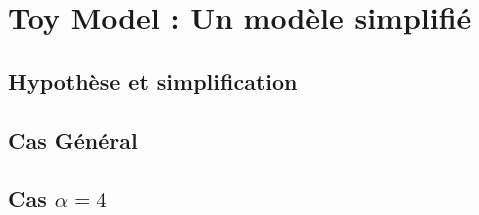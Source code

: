 \chapter{Toy Model : Un modèle simplifié\label{chp::toymodel}}
	\minitoc

	\section{Hypothèse et simplification}
		

	\section{Cas Général}
		

	\section{Cas $\alpha  = 4$}
		

%		
%
%		

